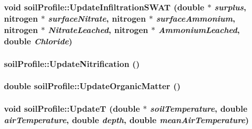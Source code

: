 \label{classsoil_profile_a2338366aa1f67cfeefb60ed5be15d65a}
\hypertarget{classsoil_profile_a942247912493da600aafecfa845d2d9c}{
\subsubsection[{UpdateInfiltrationSWAT}]{\setlength{\rightskip}{0pt plus 5cm}void soilProfile::UpdateInfiltrationSWAT (double $\ast$ {\em surplus}, \/  {\bf nitrogen} $\ast$ {\em surfaceNitrate}, \/  {\bf nitrogen} $\ast$ {\em surfaceAmmonium}, \/  {\bf nitrogen} $\ast$ {\em NitrateLeached}, \/  {\bf nitrogen} $\ast$ {\em AmmoniumLeached}, \/  double {\em Chloride})}}
\label{classsoil_profile_a942247912493da600aafecfa845d2d9c}
\hypertarget{classsoil_profile_a4a0d204ede21c28dc81b117813781ee1}{
\subsubsection[{UpdateNitrification}]{ soilProfile::UpdateNitrification ()}}
\label{classsoil_profile_a4a0d204ede21c28dc81b117813781ee1}
\hypertarget{classsoil_profile_a9928340939c7a139c0e708be2e7d4ca0}{
\subsubsection[{UpdateOrganicMatter}]{\setlength{\rightskip}{0pt plus 5cm}double soilProfile::UpdateOrganicMatter ()}}
\label{classsoil_profile_a9928340939c7a139c0e708be2e7d4ca0}
\hypertarget{classsoil_profile_a746e2b78952a19280ace39d3518dc109}{
\subsubsection[{UpdateT}]{\setlength{\rightskip}{0pt plus 5cm}void soilProfile::UpdateT (double $\ast$ {\em soilTemperature}, \/  double {\em airTemperature}, \/  double {\em depth}, \/  double {\em meanAirTemperature})}}
